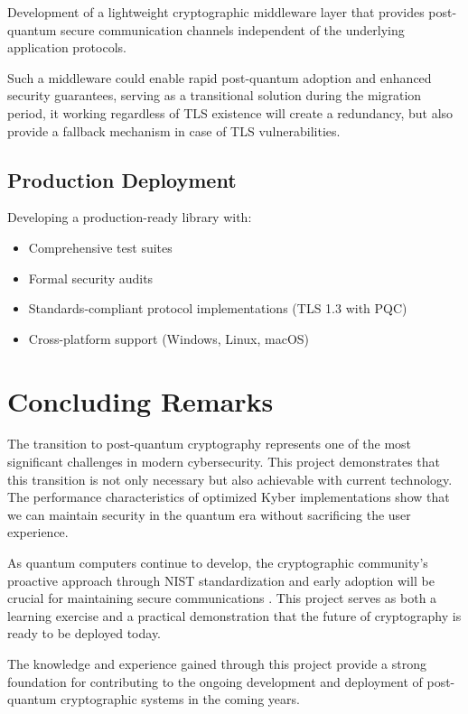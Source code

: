 Development of a lightweight cryptographic middleware layer that provides post-quantum secure communication channels independent of the underlying application protocols.

Such a middleware could enable rapid post-quantum adoption and enhanced security guarantees, serving as a transitional solution during the migration period, it working regardless of TLS existence will create a redundancy, but also provide a fallback mechanism in case of TLS vulnerabilities.

\subsection{Production Deployment}

Developing a production-ready library with:
\begin{itemize}
\item Comprehensive test suites
\item Formal security audits
\item Standards-compliant protocol implementations (TLS 1.3 with PQC)
\item Cross-platform support (Windows, Linux, macOS)
\end{itemize}

\section{Concluding Remarks}

The transition to post-quantum cryptography represents one of the most significant challenges in modern cybersecurity. This project demonstrates that this transition is not only necessary but also achievable with current technology. The performance characteristics of optimized Kyber implementations show that we can maintain security in the quantum era without sacrificing the user experience.

As quantum computers continue to develop, the cryptographic community's proactive approach through NIST standardization and early adoption will be crucial for maintaining secure communications \cite{Mosca2018}. This project serves as both a learning exercise and a practical demonstration that the future of cryptography is ready to be deployed today.

The knowledge and experience gained through this project provide a strong foundation for contributing to the ongoing development and deployment of post-quantum cryptographic systems in the coming years.
